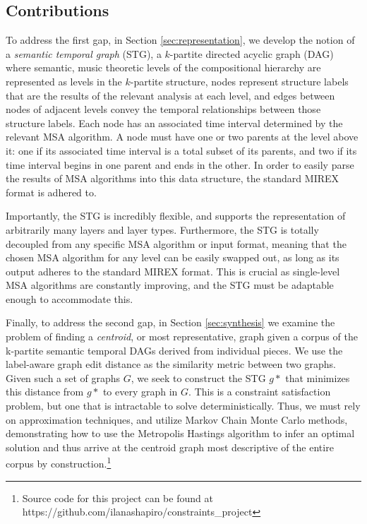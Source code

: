 \documentclass{article}
\begin{document}
\subsection{Contributions}\label{subsec:contributions}

To address the first gap, in Section \ref{sec:representation}, we develop the notion of a \textit{semantic temporal graph} (STG), a $k$-partite directed acyclic graph (DAG) where semantic, music theoretic levels of the compositional hierarchy are represented as levels in the $k$-partite structure, nodes represent structure labels that are the results of the relevant analysis at each level, and edges between nodes of adjacent levels convey the temporal relationships between those structure labels. Each node has an associated time interval determined by the relevant MSA algorithm. A node must have one or two parents at the level above it: one if its associated time interval is a total subset of its parents, and two if its time interval begins in one parent and ends in the other. In order to easily parse the results of MSA algorithms into this data structure, the standard MIREX format is adhered to.

Importantly, the STG is incredibly flexible, and supports the representation of arbitrarily many layers and layer types. Furthermore, the STG is totally decoupled from any specific MSA algorithm or input format, meaning that the chosen MSA algorithm for any level can be easily swapped out, as long as its output adheres to the standard MIREX format. This is crucial as single-level MSA algorithms are constantly improving, and the STG must be adaptable enough to accommodate this.

Finally, to address the second gap, in Section \ref{sec:synthesis} we examine the problem of finding a \textit{centroid}, or most representative, graph given a corpus of the k-partite semantic temporal DAGs derived from individual pieces. We use the label-aware graph edit distance as the similarity metric between two graphs. Given such a set of graphs $G$, we seek to construct the STG $g*$ that minimizes this distance from $g*$ to every graph in $G$. This is a constraint satisfaction problem, but one that is intractable to solve deterministically. Thus, we must rely on approximation techniques, and utilize Markov Chain Monte Carlo methods, demonstrating how to use the Metropolis Hastings algorithm to infer an optimal solution and thus arrive at the centroid graph most descriptive of the entire corpus by construction.\footnote{Source code for this project can be found at https://github.com/ilanashapiro/constraints\_project}
\end{document}
